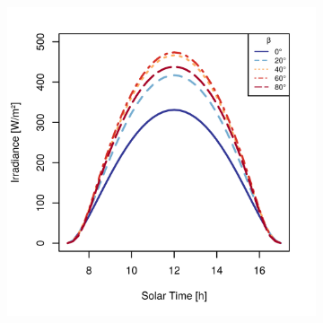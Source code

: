 \begin{figure}[h]
\captionsetup[subfigure]{justification=centering}
\vspace{-2ex}
	\centering
    \setlength{\subfigureWidth}{0.50\textwidth}
    \setlength{\graphicsHeight}{70mm}
    \hypersetup{hidelinks=true}%
  	\begin{subfigure}[t]{\subfigureWidth}
      \centering
  		\includegraphics[height=\graphicsHeight]{sections/mars-solar-energy/solar-radiation/plots/gi-variation-for-ls-248-phi-34-tau-04-gammac-south-and-albedo-027.png}
  		\label{fig:sub:irradiance-inclined-gamma-c-0}
  	\end{subfigure}\hfill
    \begin{subfigure}[t]{\subfigureWidth}
      \centering

\end{subfigure}
\end{figure}
